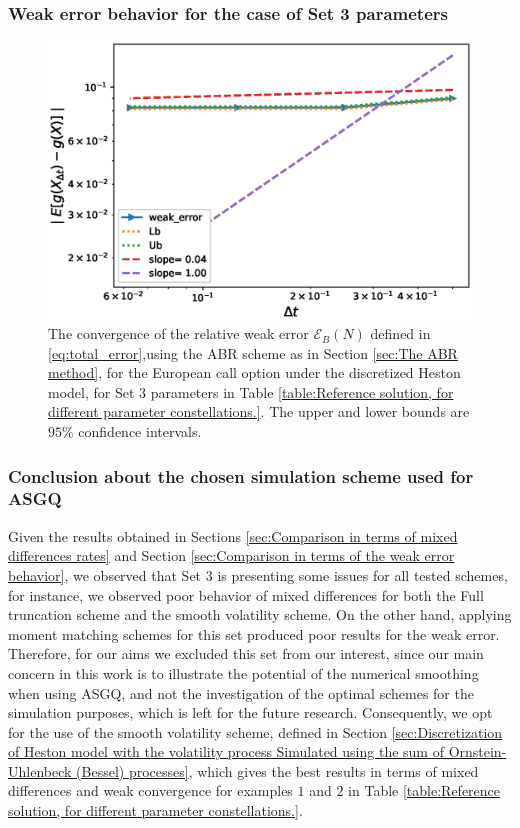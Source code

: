 \subsubsection*{Weak error behavior for the case of Set 3 parameters}


\FloatBarrier
\begin{figure}[htb]
	\centering %
		\includegraphics[width=0.5\linewidth]{./figures/Heston_single_call_ABR_moment_matching/weak_convergence/weak_convergence_order_single_call_option_heston_relative_M_1_10_7_beta_128_ABR_set3}
	\caption{The convergence of the relative weak error  $\mathcal{E}_B(N)$ defined in \ref{eq:total_error},using the ABR scheme as in Section \ref{sec:The ABR method}, for the European call option  under the discretized  Heston model, for Set $3$ parameters in Table \ref{table:Reference solution, for different parameter constellations.}. The upper and lower bounds are $95\%$ confidence intervals.}
	\label{fig:weak convergence comparison set 3}	
\end{figure}
\FloatBarrier
\subsubsection{Conclusion about the chosen simulation scheme used for ASGQ}
Given the results obtained in Sections \ref{sec:Comparison in terms of mixed differences rates} and Section \ref{sec:Comparison in terms of  the weak error behavior}, we observed that Set $3$ is presenting some issues for all tested schemes, for instance, we observed poor behavior of mixed differences for both the Full truncation scheme and the smooth volatility scheme. On the other hand, applying moment matching schemes for this set produced poor results for the weak error. Therefore, for our aims we excluded this set from our interest, since our main concern in this work is to illustrate the potential of the numerical smoothing when using ASGQ, and not the investigation of the optimal schemes for the simulation purposes, which is left for the future research. Consequently, we opt for the use of the smooth volatility scheme, defined in Section \ref{sec:Discretization of Heston model with the volatility process Simulated using the sum of  Ornstein-Uhlenbeck (Bessel) processes}, which gives the best results in terms of mixed differences and weak convergence for examples $1$ and $2$ in Table \ref{table:Reference solution, for different parameter constellations.}.

